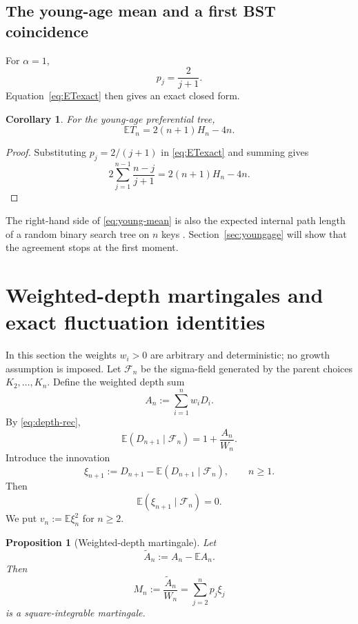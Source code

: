 \documentclass[11pt,a4paper]{article}
\newtheorem{proposition}[theorem]{Proposition}
\newtheorem{corollary}[theorem]{Corollary}
\newcommand{\E}{\mathbb{E}}
\newcommand{\1}{\mathbf{1}}
\newcommand{\F}{\mathcal{F}}
\begin{document}
\subsection{The young-age mean and a first BST coincidence}

For $\alpha=1$,
\[
p_j=\frac{2}{j+1}.
\]
Equation~\eqref{eq:ETexact} then gives an exact closed form.

\begin{corollary}\label{cor:young-mean}
For the young-age preferential tree,
\begin{equation}\label{eq:young-mean}
\E T_n=2(n+1)H_n-4n.
\end{equation}
\end{corollary}

\begin{proof}
Substituting $p_j=2/(j+1)$ in \eqref{eq:ETexact} and summing gives
\[
2\sum_{j=1}^{n-1}\frac{n-j}{j+1}
=
2(n+1)H_n-4n.
\]
\end{proof}

The right-hand side of \eqref{eq:young-mean} is also the expected internal
path length of a random binary search tree on $n$ keys
\citep{Knuth1998,FlajoletSedgewick2009}.  Section~\ref{sec:youngage} will show
that the agreement stops at the first moment.

\section{Weighted-depth martingales and exact fluctuation identities}
\label{sec:martingale}

In this section the weights $w_i>0$ are arbitrary and deterministic; no growth assumption is imposed.
Let $\F_n$ be the sigma-field generated by the parent choices
$K_2,\ldots,K_n$.  Define the weighted depth sum
\begin{equation}\label{eq:An}
A_n:=\sum_{i=1}^n w_iD_i.
\end{equation}
By \eqref{eq:depth-rec},
\begin{equation}\label{eq:cond-depth}
\E(D_{n+1}\mid\F_n)
=
1+\frac{A_n}{W_n}.
\end{equation}
Introduce the innovation
\begin{equation}\label{eq:xi}
\xi_{n+1}
:=
D_{n+1}-\E(D_{n+1}\mid\F_n),
\qquad n\ge1.
\end{equation}
Then
\[
\E(\xi_{n+1}\mid\F_n)=0.
\]
We put $v_n:=\E\xi_n^2$ for $n\ge2$.

\begin{proposition}[Weighted-depth martingale]\label{prop:weighted-mg}
Let
\[
\widetilde A_n:=A_n-\E A_n.
\]
Then
\begin{equation}\label{eq:M-def}
M_n:=\frac{\widetilde A_n}{W_n}
=
\sum_{j=2}^n p_j\xi_j
\end{equation}
is a square-integrable martingale.
\end{proposition}
\end{document}
